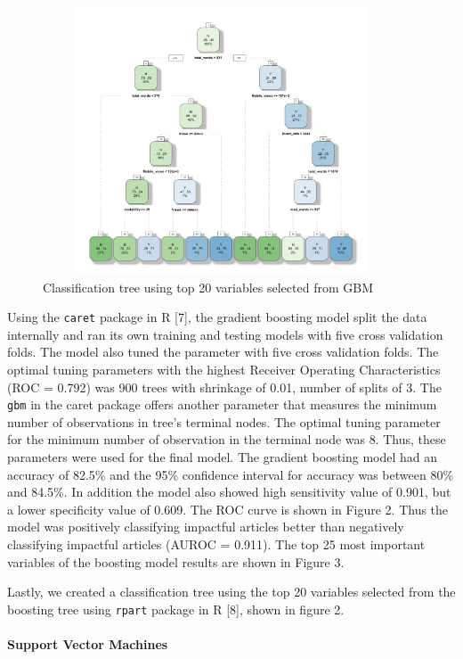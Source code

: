 \documentclass[10pt,letterpaper]{article}
\begin{document}
\begin{figure}
\includegraphics[width=400px,height=300px]{classification-Tree} \caption{ Classification tree using top 20 variables selected from GBM}\label{fig:unnamed-chunk-3}
\end{figure}

Using the \texttt{caret} package in R {[}7{]}, the gradient boosting
model split the data internally and ran its own training and testing
models with five cross validation folds. The model also tuned the
parameter with five cross validation folds. The optimal tuning
parameters with the highest Receiver Operating Characteristics (ROC =
0.792) was 900 trees with shrinkage of 0.01, number of splits of 3. The
\texttt{gbm} in the caret package offers another parameter that measures
the minimum number of observations in tree's terminal nodes. The optimal
tuning parameter for the minimum number of observation in the terminal
node was 8. Thus, these parameters were used for the final model. The
gradient boosting model had an accuracy of 82.5\% and the 95\%
confidence interval for accuracy was between 80\% and 84.5\%. In
addition the model also showed high sensitivity value of 0.901, but a
lower specificity value of 0.609. The ROC curve is shown in Figure 2.
Thus the model was positively classifying impactful articles better than
negatively classifying impactful articles (AUROC = 0.911). The top 25
most important variables of the boosting model results are shown in
Figure 3.

Lastly, we created a classification tree using the top 20 variables
selected from the boosting tree using \texttt{rpart} package in R
{[}8{]}, shown in figure 2.

\hypertarget{support-vector-machines}{%
\paragraph{Support Vector Machines}\label{support-vector-machines}}
\end{document}
